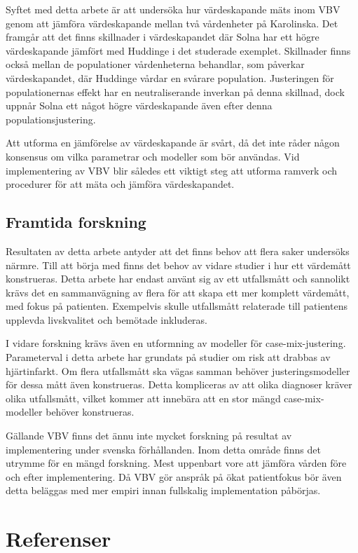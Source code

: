 Syftet med detta arbete är att undersöka hur värdeskapande mäts inom VBV genom att jämföra värdeskapande mellan två vårdenheter på Karolinska. Det framgår att det finns skillnader i värdeskapandet där Solna har ett högre värdeskapande jämfört med Huddinge i det studerade exemplet. Skillnader finns också mellan de populationer vårdenheterna behandlar, som påverkar värdeskapandet, där Huddinge vårdar en svårare population. Justeringen för populationernas effekt har en neutraliserande inverkan på denna skillnad, dock uppnår Solna ett något högre värdeskapande även efter denna populationsjustering.

Att utforma en jämförelse av värdeskapande är svårt, då det inte råder någon konsensus om vilka parametrar och modeller som bör användas. Vid implementering av VBV blir således ett viktigt steg att utforma ramverk och procedurer för att mäta och jämföra värdeskapandet. 

\subsection{Framtida forskning}

Resultaten av detta arbete antyder att det finns behov att flera saker undersöks närmre. Till att börja med finns det behov av vidare studier i hur ett värdemått konstrueras. Detta arbete har endast använt sig av ett utfallsmått och sannolikt krävs det en sammanvägning av flera för att skapa ett mer komplett värdemått, med fokus på patienten. Exempelvis skulle utfallsmått relaterade till patientens upplevda livskvalitet och bemötade inkluderas.

I vidare forskning krävs även en utformning av modeller för case-mix-justering. Parameterval i detta arbete har grundats på studier om risk att drabbas av hjärtinfarkt. Om flera utfallsmått ska vägas samman behöver justeringsmodeller för dessa mått även konstrueras. Detta kompliceras av att olika diagnoser kräver olika utfallsmått, vilket kommer att innebära att en stor mängd case-mix-modeller behöver konstrueras.

Gällande VBV finns det ännu inte mycket forskning på resultat av implementering under svenska förhållanden. Inom detta område finns det utrymme för en mängd forskning. Mest uppenbart vore att jämföra vården före och efter implementering. Då VBV gör anspråk på ökat patientfokus bör även detta beläggas med mer empiri innan fullskalig implementation påbörjas.

\section{Referenser}
\setlength{\parindent}{0cm}

